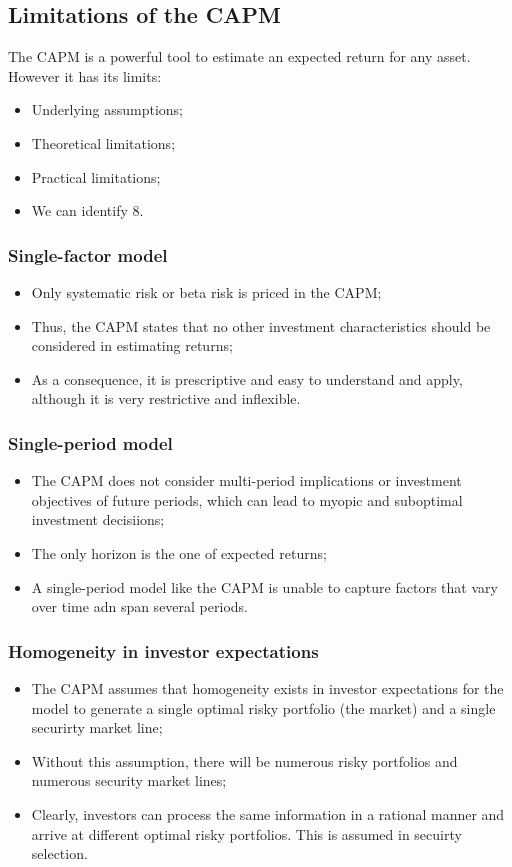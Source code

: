 \documentclass[11pt,a4paper]{report}
\begin{document}
\subsection{Limitations of the CAPM}
The CAPM is a powerful tool to estimate an expected return for any asset. However it has its limits:
\begin{itemize}
    \item Underlying assumptions;
    \item Theoretical limitations;
    \item Practical limitations;
    \item We can identify 8.
\end{itemize}
\subsubsection{Single-factor model}
\begin{itemize}
    \item Only systematic risk or beta risk is priced in the CAPM;
    \item Thus, the CAPM states that no other investment characteristics should be considered in estimating returns;
    \item As a consequence, it is prescriptive and easy to understand and apply, although it is very restrictive and inflexible.
\end{itemize}
\subsubsection{Single-period model}
\begin{itemize}
    \item The CAPM does not consider multi-period implications or investment objectives of future periods, which can lead to myopic and suboptimal investment decisiions;
    \item The only horizon is the one of expected returns;
    \item A single-period model like the CAPM is unable to capture factors that vary over time adn span several periods.
\end{itemize}
\subsubsection{Homogeneity in investor expectations}
\begin{itemize}
    \item The CAPM assumes that homogeneity exists in investor expectations for the model to generate a single optimal risky portfolio (the market) and a single securirty market line;
    \item Without this assumption, there will be numerous risky portfolios and numerous security market lines;
    \item Clearly, investors can process the same information in a rational manner and arrive at different optimal risky portfolios. This is assumed in secuirty selection.
\end{itemize}
\end{document}
